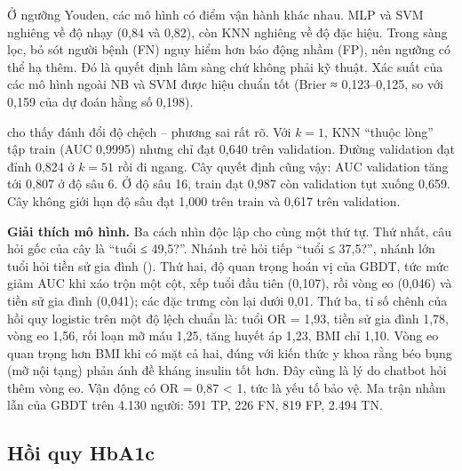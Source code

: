 Ở ngưỡng Youden, các mô hình có điểm vận hành khác nhau. MLP và SVM nghiêng về độ nhạy (0,84 và 0,82), còn KNN nghiêng về độ đặc hiệu. Trong sàng lọc, bỏ sót người bệnh (FN) nguy hiểm hơn báo động nhầm (FP), nên ngưỡng có thể hạ thêm. Đó là quyết định lâm sàng chứ không phải kỹ thuật. Xác suất của các mô hình ngoài NB và SVM được hiệu chuẩn tốt (Brier ≈ 0,123–0,125, so với 0,159 của dự đoán hằng số 0,198).


 cho thấy đánh đổi độ chệch – phương sai rất rõ. Với $k=1$, KNN ``thuộc lòng'' tập train (AUC 0,9995) nhưng chỉ đạt 0,640 trên validation. Đường validation đạt đỉnh 0,824 ở $k=51$ rồi đi ngang. Cây quyết định cũng vậy: AUC validation tăng tới 0,807 ở độ sâu 6. Ở độ sâu 16, train đạt 0,987 còn validation tụt xuống 0,659. Cây không giới hạn độ sâu đạt 1,000 trên train và 0,617 trên validation.



\textbf{Giải thích mô hình.} Ba cách nhìn độc lập cho cùng một thứ tự. Thứ nhất, câu hỏi gốc của cây là ``tuổi ≤ 49,5?''. Nhánh trẻ hỏi tiếp ``tuổi ≤ 37,5?'', nhánh lớn tuổi hỏi tiền sử gia đình (). Thứ hai, độ quan trọng hoán vị của GBDT, tức mức giảm AUC khi xáo trộn một cột, xếp tuổi đầu tiên (0,107), rồi vòng eo (0,046) và tiền sử gia đình (0,041); các đặc trưng còn lại dưới 0,01. Thứ ba, tỉ số chênh của hồi quy logistic trên một độ lệch chuẩn là: tuổi OR = 1,93, tiền sử gia đình 1,78, vòng eo 1,56, rối loạn mỡ máu 1,25, tăng huyết áp 1,23, BMI chỉ 1,10. Vòng eo quan trọng hơn BMI khi có mặt cả hai, đúng với kiến thức y khoa rằng béo bụng (mỡ nội tạng) phản ánh đề kháng insulin tốt hơn. Đây cũng là lý do chatbot hỏi thêm vòng eo. Vận động có OR = 0,87 < 1, tức là yếu tố bảo vệ. Ma trận nhầm lẫn của GBDT trên 4.130 người: 591 TP, 226 FN, 819 FP, 2.494 TN.

\subsection{Hồi quy HbA1c}

